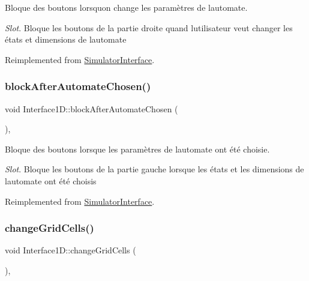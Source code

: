 Bloque des boutons lorsqu\textquotesingle{}on change les paramètres de l\textquotesingle{}automate. 

{\itshape Slot}. Bloque les boutons de la partie droite quand l\textquotesingle{}utilisateur veut changer les états et dimensions de l\textquotesingle{}automate 

Reimplemented from \mbox{\hyperlink{class_simulator_interface}{Simulator\+Interface}}.

\mbox{\label{class_interface1_d_a99c01732178e56bfbac46b70d22f710c}} 
\subsubsection{\texorpdfstring{block\+After\+Automate\+Chosen()}{blockAfterAutomateChosen()}}
{\footnotesize\ttfamily void Interface1\+D\+::block\+After\+Automate\+Chosen (\begin{DoxyParamCaption}{ }\end{DoxyParamCaption})\hspace{0.3cm}{\ttfamily [protected]}, {\ttfamily [virtual]}}



Bloque des boutons lorsque les paramètres de l\textquotesingle{}automate ont été choisie. 

{\itshape Slot}. Bloque les boutons de la partie gauche lorsque les états et les dimensions de l\textquotesingle{}automate ont été choisis 

Reimplemented from \mbox{\hyperlink{class_simulator_interface}{Simulator\+Interface}}.

\mbox{\label{class_interface1_d_a1f9cecc4a8c0dbfab493ceb01bb27717}} 
\subsubsection{\texorpdfstring{change\+Grid\+Cells()}{changeGridCells()}}
{\footnotesize\ttfamily void Interface1\+D\+::change\+Grid\+Cells (\begin{DoxyParamCaption}{ }\end{DoxyParamCaption})\hspace{0.3cm}{\ttfamily [protected]}, {\ttfamily [virtual]}}




